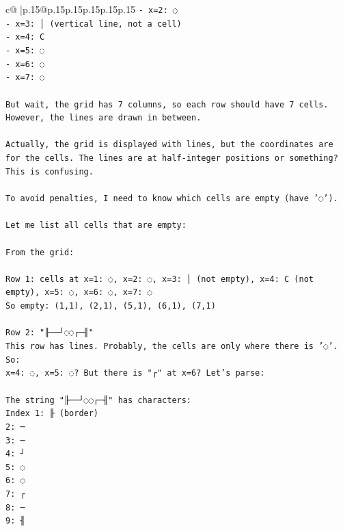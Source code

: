 \documentclass{article}
\begin{document}
{\begin{supertabular}{c@{$\;$}|p{.15\linewidth}@{}p{.15\linewidth}p{.15\linewidth}p{.15\linewidth}p{.15\linewidth}p{.15\linewidth}}
{{{\texttt{{-} x=2: ◌} \\
\texttt{{-} x=3: │ (vertical line, not a cell)} \\
\texttt{{-} x=4: C} \\
\texttt{{-} x=5: ◌} \\
\texttt{{-} x=6: ◌} \\
\texttt{{-} x=7: ◌} \\
\\ 
\texttt{But wait, the grid has 7 columns, so each row should have 7 cells. However, the lines are drawn in between.} \\
\\ 
\texttt{Actually, the grid is displayed with lines, but the coordinates are for the cells. The lines are at half{-}integer positions or something? This is confusing.} \\
\\ 
\texttt{To avoid penalties, I need to know which cells are empty (have '◌').} \\
\\ 
\texttt{Let me list all cells that are empty:} \\
\\ 
\texttt{From the grid:} \\
\\ 
\texttt{Row 1: cells at x=1: ◌, x=2: ◌, x=3: │ (not empty), x=4: C (not empty), x=5: ◌, x=6: ◌, x=7: ◌} \\
\texttt{So empty: (1,1), (2,1), (5,1), (6,1), (7,1)} \\
\\ 
\texttt{Row 2: "╟──┘◌◌┌─╢"} \\
\texttt{This row has lines. Probably, the cells are only where there is '◌'. So:} \\
\texttt{x=4: ◌, x=5: ◌? But there is "┌" at x=6? Let's parse:} \\
\\ 
\texttt{The string "╟──┘◌◌┌─╢" has characters: } \\
\texttt{Index 1: ╟ (border)} \\
\texttt{2: ─} \\
\texttt{3: ─} \\
\texttt{4: ┘} \\
\texttt{5: ◌} \\
\texttt{6: ◌} \\
\texttt{7: ┌} \\
\texttt{8: ─} \\
\texttt{9: ╢} \\
\\ 
}}}
\end{supertabular}}
\end{document}
